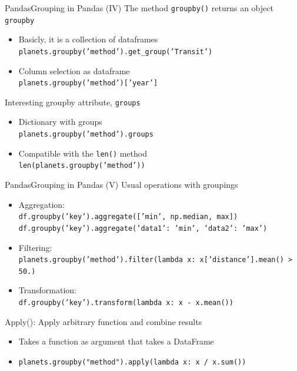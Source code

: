 \documentclass[10pt,compress]{beamer} %
\begin{document}
\begin{frame}{Pandas}{Grouping in Pandas (IV)}
	The method \texttt{groupby()} returns an object \texttt{groupby}
	\begin{itemize}
		\item Basicly, it is a collection of dataframes\\
		      \texttt{planets.groupby('method').get\_group('Transit')}
		\item Column selection as dataframe\\
		      \texttt{planets.groupby('method')['year']}
	\end{itemize}
	Interesting groupby attribute, \texttt{groups}
	\begin{itemize}
		\item Dictionary with groups\\
		      \texttt{planets.groupby('method').groups}
		\item Compatible with the \texttt{len()} method\\
		      \texttt{len(planets.groupby('method'))}
	\end{itemize}
\end{frame}

\begin{frame}{Pandas}{Grouping in Pandas (V)}
	Usual operations with groupings
	\begin{itemize}
		\item Aggregation: \\
			\texttt{df.groupby('key').aggregate(['min', np.median, max])}\\
			\texttt{df.groupby('key').aggregate({'data1': 'min', 'data2': 'max'})}
		\item Filtering: \\
			\texttt{planets.groupby('method').filter(lambda x: x['distance'].mean() > 50.)}
		\item Transformation: \\
			\texttt{df.groupby('key').transform(lambda x: x - x.mean())}
	\end{itemize}
	Apply(): Apply arbitrary function and combine results
		\begin{itemize}
			\item Takes a function as argument that takes a DataFrame
			\item[] \texttt{planets.groupby("method").apply(lambda x: x / x.sum())}
		\end{itemize}
\end{frame}
\end{document}
